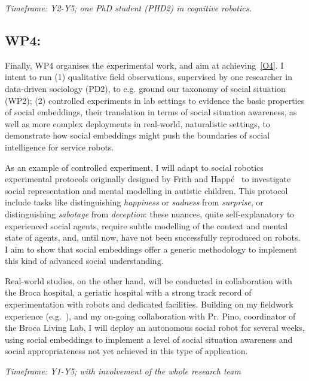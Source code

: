 \vspace{1em}
\noindent\emph{Timeframe: Y2-Y5; one PhD student (PHD2) in cognitive robotics.}

\subsection{WP4: \textbf{\WPD}}

Finally, WP4 organises the experimental work, and aim at achieving~\ref{O4}. I
intent to run (1) qualitative field observations, supervised by one researcher
in data-driven sociology (PD2), to e.g. ground our taxonomy of social situation
(WP2); (2) controlled experiments in lab
settings to evidence the basic properties of social embeddings, their
translation in terms of social situation awareness, as well as more complex
deployments in real-world, naturalistic settings, to demonstrate how social
embeddings might push the boundaries of social intelligence for service robots.

As an example of controlled experiment, I will adapt to social
robotics~\cite{lemaignan2015mutual} experimental protocols originally designed
by Frith and Happé~\cite{frith1994autism} to investigate social representation
and mental modelling in autistic children. This protocol include tasks like
distinguishing \emph{happiness} or \emph{sadness} from \emph{surprise}, or
distinguishing \emph{sabotage} from \emph{deception}: these nuances, quite
self-explanatory to experienced social agents, require subtle modelling of the
context and mental state of agents, and, until now, have not been successfully
reproduced on robots. I aim to show that social embeddings offer a generic
methodology to implement this kind of advanced social understanding.

Real-world studies, on the other hand, will be conducted in collaboration with
the Broca hospital, a geriatic hospital with a strong track record of
experimentation with robots and dedicated facilities.  Building on my
fieldwork
experience
(e.g.~\cite{hood2015when,mondada2015ranger,winkle2018social,cooper2023challenges}),
and my on-going collaboration with Pr. Pino, coordinator of the Broca Living Lab, I will
deploy an autonomous social robot for several weeks, using social embeddings to
implement a level of social situation awareness and social appropriateness not yet
achieved in this type of application.

\vspace{1em}
\noindent\emph{Timeframe: Y1-Y5; with involvement of the whole research team}

